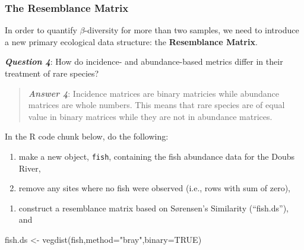 \documentclass[
]{article}
\newenvironment{Shaded}{\begin{snugshade}}{\end{snugshade}}
\newcommand{\AttributeTok}[1]{\textcolor[rgb]{0.77,0.63,0.00}{#1}}
\newcommand{\CommentTok}[1]{\textcolor[rgb]{0.56,0.35,0.01}{\textit{#1}}}
\newcommand{\ConstantTok}[1]{\textcolor[rgb]{0.00,0.00,0.00}{#1}}
\newcommand{\DecValTok}[1]{\textcolor[rgb]{0.00,0.00,0.81}{#1}}
\newcommand{\FunctionTok}[1]{\textcolor[rgb]{0.00,0.00,0.00}{#1}}
\newcommand{\NormalTok}[1]{#1}
\newcommand{\OtherTok}[1]{\textcolor[rgb]{0.56,0.35,0.01}{#1}}
\newcommand{\SpecialCharTok}[1]{\textcolor[rgb]{0.00,0.00,0.00}{#1}}
\newcommand{\StringTok}[1]{\textcolor[rgb]{0.31,0.60,0.02}{#1}}
\providecommand{\tightlist}{%
  \setlength{\itemsep}{0pt}\setlength{\parskip}{0pt}}
\begin{document}
\hypertarget{the-resemblance-matrix}{%
\subsubsection{The Resemblance Matrix}\label{the-resemblance-matrix}}

In order to quantify \(\beta\)-diversity for more than two samples, we
need to introduce a new primary ecological data structure: the
\textbf{Resemblance Matrix}.

\textbf{\emph{Question 4}}: How do incidence- and abundance-based
metrics differ in their treatment of rare species?

\begin{quote}
\textbf{\emph{Answer 4}}: Incidence matrices are binary matricies while
abundance matrices are whole numbers. This means that rare species are
of equal value in binary matrices while they are not in abundance
matrices.
\end{quote}

In the R code chunk below, do the following:

\begin{enumerate}
\def\labelenumi{\arabic{enumi}.}
\tightlist
\item
  make a new object, \texttt{fish}, containing the fish abundance data
  for the Doubs River,
\item
  remove any sites where no fish were observed (i.e., rows with sum of
  zero),
\end{enumerate}

\begin{Shaded}
\end{Shaded}

\begin{enumerate}
\def\labelenumi{\arabic{enumi}.}
\setcounter{enumi}{2}
\tightlist
\item
  construct a resemblance matrix based on Sørensen's Similarity
  (``fish.ds''), and
\end{enumerate}

\begin{Shaded}
\begin{Highlighting}[]
\NormalTok{fish.ds }\OtherTok{\textless{}{-}} \FunctionTok{vegdist}\NormalTok{(fish,}\AttributeTok{method=}\StringTok{"bray"}\NormalTok{,}\AttributeTok{binary=}\ConstantTok{TRUE}\NormalTok{)}
\end{Highlighting}
\end{Shaded}
\end{document}
